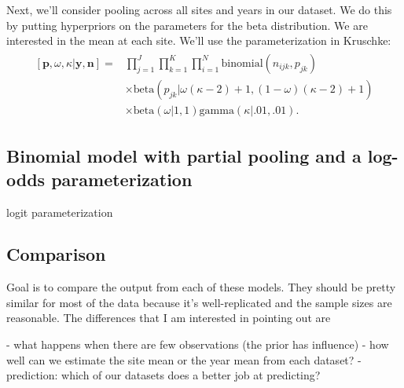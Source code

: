 \documentclass[12pt, oneside, titlepage]{article}   	%
\begin{document}
Next, we'll consider pooling across all sites and years in our dataset. We do this by putting hyperpriors on the parameters for the beta distribution. We are interested in the mean at each site. We'll use the parameterization in Kruschke:
%
\begin{align}
  \begin{split}
[\bm{p},\omega,\kappa|\bm{y},\bm{n}]  = & \prod_{j=1}^J \prod_{k=1}^K \prod_{i=1}^N \mathrm{binomial}(n_{ijk},p_{jk}) 
    \\ & \times \mathrm{beta} (  p_{jk} | \omega(\kappa-2) +1 , (1-\omega) (\kappa -2) + 1) 
    \\ & \times \mathrm{beta} ( \omega | 1, 1) \mathrm{gamma} ( \kappa | .01, .01)  .
  \end{split}
\end{align}



\subsection*{Binomial model with partial pooling and a log-odds parameterization}

logit parameterization 

\subsection*{Comparison}

Goal is to compare the output from each of these models. They should be pretty similar for most of the data because it's well-replicated and the sample sizes are reasonable. The differences that I am interested in pointing out are

- what happens when there are few observations (the prior has influence)
- how well can we estimate the site mean or the year mean from each dataset?
- prediction: which of our datasets does a better job at predicting?

\clearpage

\end{document}
